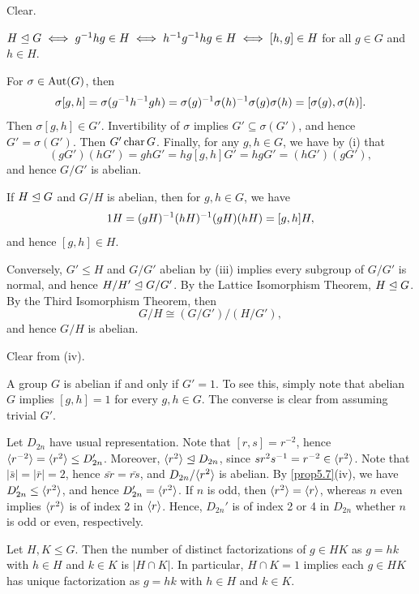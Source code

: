 \begin{proofnum}
    \item Clear.
    \item $H \trianglelefteq G \iff g^{-1} hg \in H \iff h^{-1} g^{-1} hg \in H \iff [h, g] \in H$ for all $g \in G$ and $h \in H$.
    \item For $\sigma \in \operatorname{Aut}(G)$, then
    \[\sigma[g, h] = \sigma(g^{-1} h^{-1} gh) = \sigma(g)^{-1} \sigma(h)^{-1} \sigma(g)\sigma(h) = [\sigma(g), \sigma(h)].\]
    Then $\sigma[g, h] \in G'$. Invertibility of $\sigma$ implies $G' \subseteq \sigma(G')$, and hence $G' = \sigma(G')$. Then $G' \operatorname{char} G$. Finally, for any $g, h \in G$, we have by (i) that
    \[(gG')(hG') = ghG' = hg[g, h]G' = hgG' = (hG')(gG'),\]
    and hence $G/G'$ is abelian.
    \item If $H \trianglelefteq G$ and $G/H$ is abelian, then for $g, h \in G$, we have
    \[1H = (gH)^{-1} (hH)^{-1} (gH)(hH) = [g, h]H,\]
    and hence $[g, h] \in H$.
    
    Conversely, $G' \leq H$ and $G/G'$ abelian by (iii) implies every subgroup of $G/G'$ is normal, and hence $H/H' \trianglelefteq G/G'$. By the Lattice Isomorphism Theorem, $H \trianglelefteq G$. By the Third Isomorphism Theorem, then
    \[G/H \cong (G/G')/(H/G'),\]
    and hence $G/H$ is abelian.
    \item Clear from (iv).
\end{proofnum}

\ex A group $G$ is abelian if and only if $G' = 1$. To see this, simply note that abelian $G$ implies $[g, h] = 1$ for every $g, h \in G$. The converse is clear from assuming trivial $G'$.

\ex Let $D_{2n}$ have usual representation. Note that $[r, s] = r^{-2}$, hence $\langle r^{-2}\rangle = \langle r^2\rangle \leq D_{2n}'$. Moreover, $\langle r^2\rangle \trianglelefteq D_{2n}$, since $sr^2s^{-1} = r^{-2} \in \langle r^2\rangle$. Note that $|\bar s| = |\bar r| = 2$, hence $\bar{sr} = \bar{rs}$, and $D_{2n}/\langle r^2\rangle$ is abelian. By \autoref{prop5.7}(iv), we have $D_{2n}' \leq \langle r^2\rangle$, and hence $D_{2n}' = \langle r^2\rangle$. If $n$ is odd, then $\langle r^2\rangle = \langle r\rangle$, whereas $n$ even implies $\langle r^2\rangle$ is of index 2 in $\langle r\rangle$. Hence, $D_{2n}'$ is of index 2 or 4 in $D_{2n}$ whether $n$ is odd or even, respectively.

\newpage

 \label{prop5.8}
Let $H, K \leq G$. Then the number of distinct factorizations of $g \in HK$ as $g = hk$ with $h \in H$ and $k \in K$ is $|H \cap K|$. In particular, $H \cap K = 1$ implies each $g \in HK$ has unique factorization as $g = hk$ with $h \in H$ and $k \in K$.

